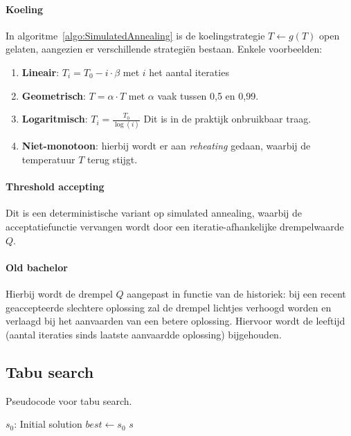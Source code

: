 \paragraph{Koeling}
In algoritme~\ref{algo:SimulatedAnnealing} is de koelingstrategie $T \gets g(T)$ open gelaten, aangezien er verschillende strategi\"en bestaan. 
Enkele voorbeelden:

\begin{enumerate}
    \item \textbf{Lineair}: $T_i = T_0 - i \cdot \beta$ met $i$ het aantal iteraties
    \item \textbf{Geometrisch}: $T = \alpha \cdot T$ met $\alpha$ vaak tussen 0,5 en 0,99.
    \item \textbf{Logaritmisch}: $T_i = \frac{T_0}{\log(i)}$ Dit is in de praktijk onbruikbaar traag.
    \item \textbf{Niet-monotoon}: hierbij wordt er aan \emph{reheating} gedaan, waarbij de temperatuur $T$ terug stijgt.
\end{enumerate}


\paragraph{Threshold accepting}
Dit is een deterministische variant op simulated annealing, waarbij de acceptatiefunctie vervangen wordt door een iteratie-afhankelijke drempelwaarde $Q$.

\paragraph{Old bachelor}
Hierbij wordt de drempel $Q$ aangepast in functie van de historiek: bij een recent geaccepteerde slechtere oplossing zal de drempel lichtjes verhoogd worden en verlaagd bij het aanvaarden van een betere oplossing. Hiervoor wordt de leeftijd (aantal iteraties sinds laatste aanvaardde oplossing) bijgehouden.

\subsection{Tabu search}

\begin{algorithm}
    \caption{Pseudocode voor tabu search.}
    \label{algo:TabuSearch}
    \begin{algorithmic} 
    \Require $s_0$: Initial solution
        \State $best \gets s_0$
        \Repeat 
            \EndIf
        \State \Return $s$ 
    \EndFunction
    \end{algorithmic}
\end{algorithm}

